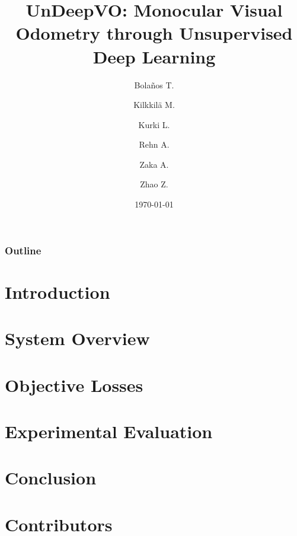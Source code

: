 \documentclass{beamer}
\title[UndeepVO]{UnDeepVO: Monocular Visual Odometry through Unsupervised Deep Learning}
\author{
    Bola\~nos T.\\
    \and
    Kilkkilä M.\\
    \and
    Kurki L.\\
    \and
    Rehn A.\\
    \and
    Zaka A.\\
    \and
    Zhao Z.
}
\date{\today}
\begin{document}
\begin{frame}
    \titlepage
\end{frame}

\begin{frame}
    \frametitle{Outline}
    \tableofcontents
\end{frame}

\section{Introduction}
\section{System Overview}
\section{Objective Losses}
\section{Experimental Evaluation}
\section{Conclusion}
\section{Contributors}








\end{document}
